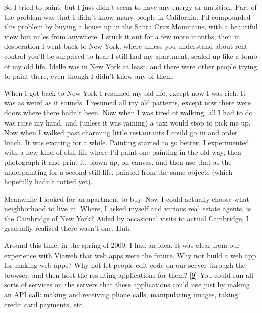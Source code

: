 So I tried to paint, but I
                  just didn't seem to have any energy or ambition. Part of the
                  problem was that I didn't know many people in California. I'd
                  compounded this problem by buying a house up in the Santa Cruz
                  Mountains, with a beautiful view but miles from anywhere. I
                  stuck it out for a few more months, then in desperation I went
                  back to New York, where unless you understand about rent
                  control you'll be surprised to hear I still had my apartment,
                  sealed up like a tomb of my old life. Idelle was in New York
                  at least, and there were other people trying to paint there,
                  even though I didn't know any of them.

When I got
                  back to New York I resumed my old life, except now I was rich.
                  It was as weird as it sounds. I resumed all my old patterns,
                  except now there were doors where there hadn't been. Now when
                  I was tired of walking, all I had to do was raise my hand, and
                  (unless it was raining) a taxi would stop to pick me up. Now
                  when I walked past charming little restaurants I could go in
                  and order lunch. It was exciting for a while. Painting started
                  to go better. I experimented with a new kind of still life
                  where I'd paint one painting in the old way, then photograph
                  it and print it, blown up, on canvas, and then use that as the
                  underpainting for a second still life, painted from the same
                  objects (which hopefully hadn't rotted yet).

Meanwhile
                  I looked for an apartment to buy. Now I could actually choose
                  what neighborhood to live in. Where, I asked myself and
                  various real estate agents, is the Cambridge of New York?
                  Aided by occasional visits to actual Cambridge, I gradually
                  realized there wasn't one. Huh.

Around this time,
                  in the spring of 2000, I had an idea. It was clear from our
                  experience with Viaweb that web apps were the future. Why not
                  build a web app for making web apps? Why not let people edit
                  code on our server through the browser, and then host the
                  resulting applications for them?
                  [\href{\#f9n}{9}]
                  You could run all sorts of services on the servers that these
                  applications could use just by making an API call: making and
                  receiving phone calls, manipulating images, taking credit card
                  payments, etc.

